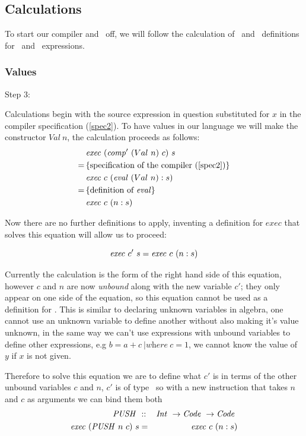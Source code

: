 \documentclass {article}
\begin{document}
\subsection{Calculations}

To start our compiler and \vm\ off,
we will follow the 
calculation of \comp\ and \exec\ definitions
for \val\ and \add\ expressions\cite[\S2.5]{bandh}.

\subsubsection{Values}
Step 3:

Calculations begin with the source expression in question 
substituted for $x$ in the compiler specification (\ref{spec2}).
To have values in our language we will make the constructor
$Val\ n$, 
the calculation proceeds as follows\cite{bandh}:
\begin{align*}
&\mathit{exec\ } (\mathit{comp'\ } (Val\ n)\ c)\ s \\
=\, & \{ \mbox{specification of the compiler (\ref{spec2})} \} \\
&\mathit{exec\ } c\ (\mathit{eval\ } (Val\ n) : s) \\
=\, & \{ \mbox{definition of \textit{eval}} \} \\
&\mathit{exec\ } c\ (n:s)
\end{align*}

Now there are no further definitions to apply,
inventing a definition for $exec$ that solves this equation
will allow us to proceed:

\[ \mathit{exec\ }  c'\ s = \mathit{exec\ }  c\ (n : s) \]

Currently the calculation is the form of
the right hand side of this equation,
however $c$ and $n$ are now \emph{unbound}
along with the new variable $c'$;
they only appear on one side of the equation,
so this equation cannot be used  as a definition
for \exec.
This is similar to declaring unknown variables 
in algebra, one cannot use an unknown variable to define
another without also making it's value unknown,
in the same way we can't use expressions with
unbound variables to define other expressions,
e.g \(b = a + c\ | \textit{where}\ c = 1\), we cannot
know the value of $y$ if $x$ is not given.

Therefore to solve this equation we are to
define what $c'$ is in terms of 
the other unbound variables $c$ and $n$,
$c'$ is of  type \code\ 
so with a new instruction that takes $n$
and $c$ as arguments we can bind them both\cite[bottom of page 9]{bandh}
\newcommand{\PUSHt}{\textit{PUSH}}
\newcommand{\PUSH}{\mathit{PUSH\ }}
\begin{eqnarray}
\PUSH &::& \Int \rightarrow \Code \rightarrow \Code \nonumber \\
\Exec (\PUSH n\ c)\ s &=& \Exec c\ (n :s) \label{execpush}
\end{eqnarray}
\end{document}
